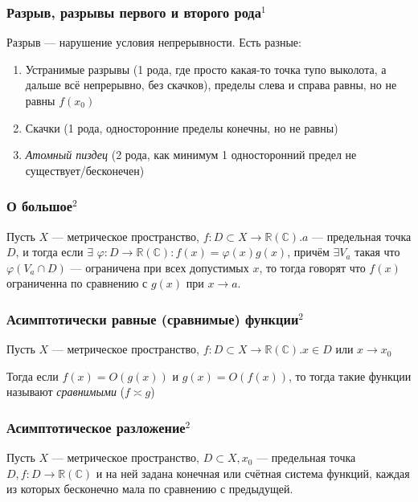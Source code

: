 \documentclass{article}
\def\dbl{\,\,}
\begin{document}
\subsubsection{Разрыв, разрывы первого и второго рода\texorpdfstring{$^1$}{}}
Разрыв --- нарушение условия непрерывности. Есть разные:
\begin{enumerate}
    \item Устранимые разрывы (1 рода, где просто какая-то точка тупо выколота, а дальше всё непрерывно, без скачков), пределы слева и справа равны, но не равны $f(x_0)$
    \item Скачки (1 рода, односторонние пределы конечны, но не равны)
    \item \textit{Атомный пиздец} (2 рода, как минимум 1 односторонний предел не существует/бесконечен)
\end{enumerate}

\subsubsection{О большое\texorpdfstring{$^2$}{}}

Пусть $X$ --- метрическое пространство, $f: D \subset X \rightarrow \mathbb{R} (\mathbb{C}). a$ --- предельная точка $D$, и тогда если $\exists \dbl \varphi: D \rightarrow \mathbb{R} (\mathbb{C}) : f(x) = \varphi(x)g(x)$, причём $\exists V_a$ такая что $\varphi(V_a \cap D)$ --- ограничена при всех допустимых $x$, то тогда говорят что $f(x)$ ограниченна по сравнению с $g(x)$ при $x \rightarrow a$.

\subsubsection{Асимптотически равные (сравнимые) функции\texorpdfstring{$^2$}{}}

Пусть $X$ --- метрическое пространство, $f: D \subset X \rightarrow \mathbb{R} (\mathbb{C}). x \in D$ или $x \rightarrow x_0$

Тогда если $f(x) = O(g(x))$ и $g(x) = O(f(x))$, то тогда
 такие функции называют \textit{сравнимыми} ($f \asymp g$)
 
\subsubsection{Асимптотическое разложение\texorpdfstring{$^2$}{}}

Пусть $X$ --- метрическое пространство, $D \subset X, x_0$ --- предельная точка $D, f: D \rightarrow \mathbb{R} (\mathbb{C})$ и на ней задана конечная или счётная система функций, каждая из которых бесконечно мала по сравнению с предыдущей. 
\end{document}
